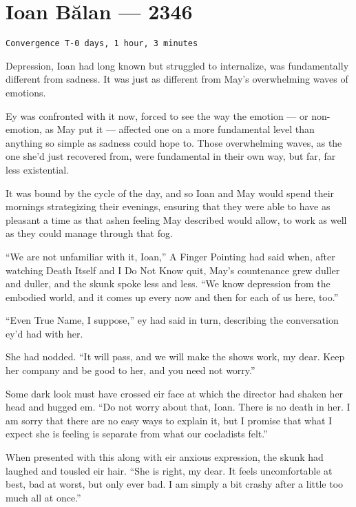 \hypertarget{ioan-bux103lan-2346}{%
\chapter{Ioan Bălan — 2346}\label{ioan-bux103lan-2346}}

\begin{verbatim}
Convergence T-0 days, 1 hour, 3 minutes
\end{verbatim}

Depression, Ioan had long known but struggled to internalize, was fundamentally different from sadness. It was just as different from May's overwhelming waves of emotions.

Ey was confronted with it now, forced to see the way the emotion — or non-emotion, as May put it — affected one on a more fundamental level than anything so simple as sadness could hope to. Those overwhelming waves, as the one she'd just recovered from, were fundamental in their own way, but far, far less existential.

It was bound by the cycle of the day, and so Ioan and May would spend their mornings strategizing their evenings, ensuring that they were able to have as pleasant a time as that ashen feeling May described would allow, to work as well as they could manage through that fog.

``We are not unfamiliar with it, Ioan,'' A Finger Pointing had said when, after watching Death Itself and I Do Not Know quit, May's countenance grew duller and duller, and the skunk spoke less and less. ``We know depression from the embodied world, and it comes up every now and then for each of us here, too.''

``Even True Name, I suppose,'' ey had said in turn, describing the conversation ey'd had with her.

She had nodded. ``It will pass, and we will make the shows work, my dear. Keep her company and be good to her, and you need not worry.''

Some dark look must have crossed eir face at which the director had shaken her head and hugged em. ``Do not worry about that, Ioan. There is no death in her. I am sorry that there are no easy ways to explain it, but I promise that what I expect she is feeling is separate from what our cocladists felt.''

When presented with this along with eir anxious expression, the skunk had laughed and tousled eir hair. ``She is right, my dear. It feels uncomfortable at best, bad at worst, but only ever bad. I am simply a bit crashy after a little too much all at once.''

